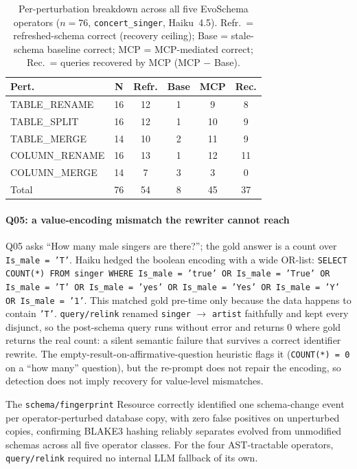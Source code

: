 \documentclass[conference,10pt,a4paper]{IEEEtran}
\begin{document}
\begin{table}[h!]
\centering
\caption{Per-perturbation breakdown across all five EvoSchema operators
($n = 76$, \texttt{concert\_singer}, Haiku~4.5). Refr.\ = refreshed-schema
correct (recovery ceiling); Base = stale-schema baseline correct;
MCP = MCP-mediated correct; Rec.\ = queries recovered by MCP (MCP $-$ Base).}
\label{tab:perpert}
\begin{tabular}{lccccc}
\toprule
\textbf{Pert.} & \textbf{N} & \textbf{Refr.} & \textbf{Base} & \textbf{MCP} & \textbf{Rec.} \\
\midrule
TABLE\_RENAME   & 16 & 12 & 1  & 9  & 8  \\
TABLE\_SPLIT    & 16 & 12 & 1  & 10 & 9  \\
TABLE\_MERGE    & 14 & 10 & 2  & 11 & 9  \\
COLUMN\_RENAME  & 16 & 13 & 1  & 12 & 11 \\
COLUMN\_MERGE   & 14 & 7  & 3  & 3  & 0  \\
\midrule
Total           & 76 & 54 & 8  & 45 & 37 \\
\bottomrule
\end{tabular}
\end{table}

\paragraph*{Q05: a value-encoding mismatch the rewriter cannot reach}
Q05 asks ``How many male singers are there?''; the gold answer is a
count over \texttt{Is\_male = 'T'}. Haiku hedged the boolean encoding
with a wide OR-list: \texttt{SELECT COUNT(*) FROM singer WHERE
Is\_male = 'true' OR Is\_male = 'True' OR Is\_male = 'T' OR Is\_male =
'yes' OR Is\_male = 'Yes' OR Is\_male = 'Y' OR Is\_male = '1'}. This
matched gold pre-time only because the data happens to contain
\texttt{'T'}. \texttt{query/relink} renamed \texttt{singer} $\to$
\texttt{artist} faithfully and kept every disjunct, so the post-schema
query runs without error and returns $0$ where gold returns the real
count: a silent semantic failure that survives a correct identifier
rewrite. The empty-result-on-affirmative-question heuristic flags it
(\texttt{COUNT(*) = 0} on a ``how many'' question), but the re-prompt
does not repair the encoding, so detection does not imply recovery for
value-level mismatches.

The \texttt{schema/fingerprint} Resource correctly identified one
schema-change event per operator-perturbed database copy, with zero
false positives on unperturbed copies, confirming BLAKE3 hashing
reliably separates evolved from unmodified schemas across all five
operator classes. For the four AST-tractable operators,
\texttt{query/relink} required no internal LLM fallback of its own.
\end{document}

